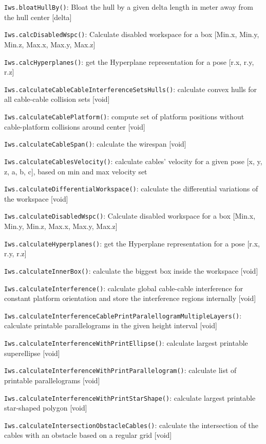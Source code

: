 \documentclass[11pt,a4paper,onepage,openany]{book}
\begin{document}
\texttt{Iws.bloatHullBy()}: Bloat the hull by a given delta length in meter away from the hull center [delta]

\texttt{Iws.calcDisabledWspc()}: Calculate disabled workspace for a box [Min.x, Min.y, Min.z, Max.x, Max.y, Max.z]

\texttt{Iws.calcHyperplanes()}: get the Hyperplane representation for a pose [r.x, r.y, r.z]

\texttt{Iws.calculateCableCableInterferenceSetsHulls()}: calculate convex hulls for all cable-cable collision sets [void]

\texttt{Iws.calculateCablePlatform()}: compute set of platform positions without cable-platform collisions around center [void]

\texttt{Iws.calculateCableSpan()}: calculate the wirespan [void]

\texttt{Iws.calculateCablesVelocity()}: calculate cables' velocity for a given pose [x, y, z, a, b, c], based on min and max velocity set

\texttt{Iws.calculateDifferentialWorkspace()}: calculate the differential variations of the workspace [void]

\texttt{Iws.calculateDisabledWspc()}: Calculate disabled workspace for a box [Min.x, Min.y, Min.z, Max.x, Max.y, Max.z]

\texttt{Iws.calculateHyperplanes()}: get the Hyperplane representation for a pose [r.x, r.y, r.z]

\texttt{Iws.calculateInnerBox()}: calculate the biggest box inside the workspace [void]

\texttt{Iws.calculateInterference()}: calculate global cable-cable interference for constant platform orientation and store the interference regions internally [void]

\texttt{Iws.calculateInterferenceCablePrintParalellogramMultipleLayers()}: calculate printable parallelograms in the given height interval [void]

\texttt{Iws.calculateInterferenceWithPrintEllipse()}: calculate largest printable superellipse [void]

\texttt{Iws.calculateInterferenceWithPrintParallelogram()}: calculate list of printable parallelograms [void]

\texttt{Iws.calculateInterferenceWithPrintStarShape()}: calculate largest printable star-shaped polygon [void]

\texttt{Iws.calculateIntersectionObstacleCables()}: calculate the intersection of the cables with an obstacle based on a regular grid [void]
\end{document}
